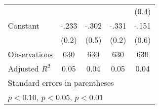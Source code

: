 \begin{table}[htbp]
\begin{tabular}{l*{4}{c}}
                &                  &                  &                  &    (0.4)         \\
Constant        &    -.233         &    -.302         &    -.331         &    -.151         \\
                &    (0.2)         &    (0.5)         &    (0.2)         &    (0.6)         \\
\hline
Observations    &      630         &      630         &      630         &      630         \\
Adjusted \(R^{2}\)&     0.05         &     0.04         &     0.05         &     0.04         \\
\hline\hline
\multicolumn{5}{l}{\footnotesize Standard errors in parentheses}\\
\multicolumn{5}{l}{\footnotesize \sym{*} \(p<0.10\), \sym{**} \(p<0.05\), \sym{***} \(p<0.01\)}\\
\end{tabular}
\end{table}
